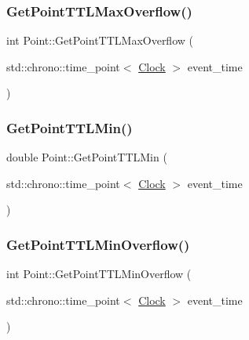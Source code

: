 \mbox{\label{classPoint_a61d7e0fb0fd0280f628ea46609082809}} 
\subsubsection{\texorpdfstring{Get\+Point\+T\+T\+L\+Max\+Overflow()}{GetPointTTLMaxOverflow()}}
{\footnotesize\ttfamily int Point\+::\+Get\+Point\+T\+T\+L\+Max\+Overflow (\begin{DoxyParamCaption}\item[{std\+::chrono\+::time\+\_\+point$<$ \mbox{\hyperlink{universe_8h_a0ef8d951d1ca5ab3cfaf7ab4c7a6fd80}{Clock}} $>$}]{event\+\_\+time }\end{DoxyParamCaption})\hspace{0.3cm}{\ttfamily [inline]}}

\mbox{\label{classPoint_a272b99a9cd054b09c8944b9f0e657890}} 
\subsubsection{\texorpdfstring{Get\+Point\+T\+T\+L\+Min()}{GetPointTTLMin()}}
{\footnotesize\ttfamily double Point\+::\+Get\+Point\+T\+T\+L\+Min (\begin{DoxyParamCaption}\item[{std\+::chrono\+::time\+\_\+point$<$ \mbox{\hyperlink{universe_8h_a0ef8d951d1ca5ab3cfaf7ab4c7a6fd80}{Clock}} $>$}]{event\+\_\+time }\end{DoxyParamCaption})\hspace{0.3cm}{\ttfamily [inline]}}

\mbox{\label{classPoint_a72b222f880df30ebcc12ddc1a6d430b5}} 
\subsubsection{\texorpdfstring{Get\+Point\+T\+T\+L\+Min\+Overflow()}{GetPointTTLMinOverflow()}}
{\footnotesize\ttfamily int Point\+::\+Get\+Point\+T\+T\+L\+Min\+Overflow (\begin{DoxyParamCaption}\item[{std\+::chrono\+::time\+\_\+point$<$ \mbox{\hyperlink{universe_8h_a0ef8d951d1ca5ab3cfaf7ab4c7a6fd80}{Clock}} $>$}]{event\+\_\+time }\end{DoxyParamCaption})\hspace{0.3cm}{\ttfamily [inline]}}

